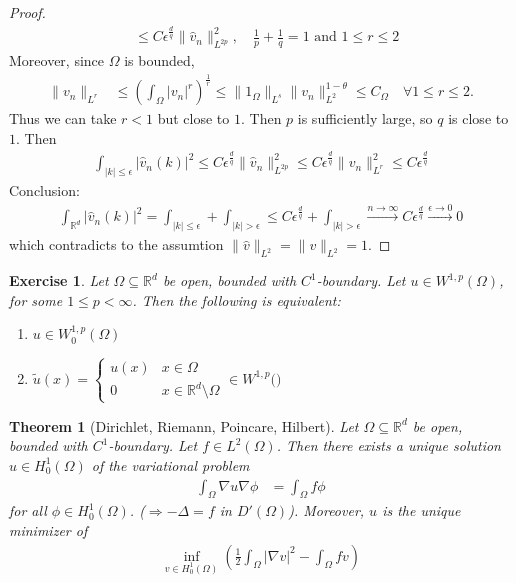 \documentclass{report}
\theoremstyle{tommy}
\newtheorem{thm}[defn]{Theorem}
\newtheorem{ex}[defn]{Exercise}
\begin{document}
\begin{proof}
\begin{align*}
      & \le C \epsilon^{\frac{d}{q}}\|\hat v_n\|_{L^{2p}}^2, \quad \frac{1}{p} + \frac{1}{q} = 1 \text{ and } 1 \le r \le 2
    \end{align*}
    Moreover, since \(\Omega\) is bounded, 
    \begin{align*}
      \|v_n\|_{L^r} &\le \left(\int_\Omega |v_n|^r\right)^{\frac{1}{r}} \le \|1_\Omega\|_{L^s} \|v_n\|_{L^2}^{1 - \theta} \le C_\Omega \quad \forall 1 \le r \le 2.
    \end{align*}
    Thus we can take \(r < 1\) but close to \(1\). Then \(p\) is sufficiently large, so \(q\) is close to \(1\). Then 
    \begin{align*}
      \int_{|k| \le \epsilon} |\hat v_n(k)|^2 \le C \epsilon^{\frac{d}{q}} \|\hat v_n\|_{L^{2p}}^2 \le C \epsilon^{\frac{d}{q}} \|v_n\|_{L^r}^2 \le C \epsilon^{\frac{d}{q}}
    \end{align*}
    Conclusion:
    \begin{align*}
      \int_{\mathbb{R}^d} |\hat v_n(k)|^2 
      = \int_{|k| \le \epsilon} + \int_{|k| > \epsilon} \le C \epsilon^{\frac{d}{q}} + \int_{|k| > \epsilon} \xrightarrow{n \to \infty} C \epsilon^{\frac{d}{q}} \xrightarrow{\epsilon \to 0} 0
    \end{align*}
    which contradicts to the assumtion \(\|\hat v\|_{L^2} = \|v\|_{L^2} = 1\).
  \end{proof}

  \begin{ex}
    Let \(\Omega \subseteq \mathbb{R}^d\) be open, bounded with \(C^1\)-boundary. Let \(u \in W^{1,p}(\Omega)\), for some \(1 \le p < \infty\). Then the following is equivalent:
    \begin{enumerate}[label=\alph*)]
      \item \(u \in W^{1,p}_0(\Omega)\)
      \item \(\tilde u(x) = \begin{cases}
        u(x) & x \in \Omega \\ 0 & x \in \mathbb{R}^d \setminus \Omega
      \end{cases} \in W^{1,p}(\mathbb)\)
    \end{enumerate}
  \end{ex}

  \begin{thm}[Dirichlet, Riemann, Poincare, Hilbert]\label{Dirichlet, Riemann, Poincare, Hilbert}
    Let \(\Omega \subseteq \mathbb{R}^d\) be open, bounded with \(C^1\)-boundary. Let \(f \in L^2(\Omega)\). Then there exists a unique solution \(u \in H_0^1(\Omega)\) of the variational problem 
    \begin{align*}
      \int_\Omega \nabla u \nabla \phi &= \int_\Omega f \phi
    \end{align*}
    for all \(\phi \in H_0^1(\Omega)\). (\(\Rightarrow - \Delta = f\) in \(D'(\Omega)\)). Moreover, \(u\) is the unique minimizer of 
    \begin{align*}
      \inf_{v \in H_0^1(\Omega)} \left(\frac{1}{2} \int_\Omega |\nabla v|^2 - \int_\Omega f v\right)
    \end{align*}
  \end{thm}
\end{document}
